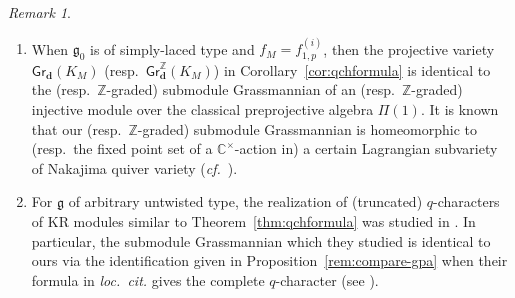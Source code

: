 \documentclass[12pt]{amsart}
\theoremstyle{definition}
\theoremstyle{remark}
\newtheorem{remark}[theorem]{Remark}
\numberwithin{equation}{section}
\newcommand{\confer}{\textit{cf.}\ }
\begin{document}
\begin{remark}
    \begin{enumerate}
        \item[(i)] When $\mathfrak{g}_0$ is of simply-laced type and $f_M=f_{1, p}^{(i)}$, then the projective variety $\mathsf{Gr}_{\mathbf{d}}(K_M)$ (resp.\ $\mathsf{Gr}^{\mathbb{Z}}_{\mathbf{d}}(K_M)$) in Corollary~\ref{cor:qchformula} is identical to the (resp.\ $\mathbb{Z}$-graded) submodule Grassmannian of an (resp.\ $\mathbb{Z}$-graded) injective module over the classical preprojective algebra $\Pi(1)$. It is known that our (resp.\ $\mathbb{Z}$-graded) submodule Grassmannian is homeomorphic to (resp.\ the fixed point set of a $\mathbb{C}^\times$-action in) a certain Lagrangian subvariety of Nakajima quiver variety (\confer\cite{Lus98,ST11,Shi10}).
        \item[(ii)] For $\mathfrak{g}$ of arbitrary untwisted type, the realization of (truncated) $q$-characters of KR modules similar to Theorem~\ref{thm:qchformula} was studied in \cite[Theorem~4.8]{HL16}. In particular, the submodule Grassmannian which they studied is identical to ours via the identification given in Proposition~\ref{rem:compare-gpa} when their formula in \textit{loc.~cit.} gives the complete $q$-character (see \cite[Remark~4.9]{HL16}).
    \end{enumerate}
\end{remark}
\end{document}
